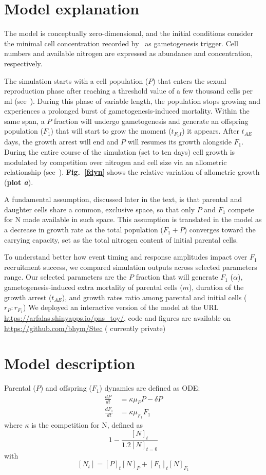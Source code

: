 \documentclass[a4paper,oneside]{article}
\begin{document}
  \section*{Model explanation}
    The model is conceptually zero-dimensional, and the initial conditions consider the minimal cell concentration recorded by~\cite{scalco2014dynamics} as gametogenesis trigger.
    Cell numbers and available nitrogen are expressed as abundance and concentration, respectively.

    The simulation starts with a cell population ($P$) that enters the sexual reproduction phase after reaching a threshold value of a few thousand cells per ml (see~\cite{scalco2014dynamics}).
    During this phase of variable length, the population stops growing and experiences a prolonged burst of gametogenesis-induced mortality.
    Within the same span, a $P$ fraction will undergo gametogenesis and generate an offspring population ($F_{1}$) that will start to grow the moment ($t_{F_{1}I}$) it appears.
    After $t_{AE}$ days, the growth arrest will end and $P$ will resumes its growth alongside $F_{1}$.
    During the entire course of the simulation (set to ten days) cell growth is modulated by competition over nitrogen and cell size via an allometric relationship (see~\cite{d2010time}).
    \textbf{Fig.~\ref{fdyn}} shows the relative variation of allometric growth (\textbf{plot {\color{blue}\textit{a}}}).

    A fundamental assumption, discussed later in the text, is that parental and daughter cells share a common, exclusive space, so that only $P$ and $F_{1}$ compete for N made available in such space.
    This assumption is translated in the model as a decrease in growth rate as the total population ($F_{1} + P$) converges toward the carrying capacity, set as the total nitrogen content of initial parental cells.

    To understand better how event timing and response amplitudes impact over $F_{1}$ recruitment success, we compared simulation outputs across selected parameters range.
    Our selected parameters are the $P$ fraction that will generate $F_{1}$ ($\alpha$), gametogenesis-induced extra mortality of parental cells ($m$), duration of the growth arrest ($t_{AE}$), and growth rates ratio among parental and initial cells ($r_{P}:r_{F_{1}}$)
    We deployed an interactive version of the model at the URL \url{https://arfalas.shinyapps.io/pns_toy/}, code and figures are available on \url{https://github.com/bhym/Stec} ({\color{red} currently private})
%
  \section*{Model description}
    Parental ($P$) and offspring ($F_{1}$) dynamics are defined as ODE:\@
    \begin{align}
      \frac{dP}{dt}     &= \kappa \mu_{P} P - \delta P \\
      \frac{dF_{1}}{dt} &= \kappa \mu_{F_{1}} F_{1}
    \end{align}
    where $\kappa$ is the competition for N, defined as
    \[
      1 - \frac{{[N]}_{t}}{1.2{[N]}_{t=0}}
    \]
    with 
    \[
      [N_{t}] = {[P]}_{t} {[N]}_{P} + {[F_{1}]}_{t} {[N]}_{F_{1}}
    \]
\end{document}
